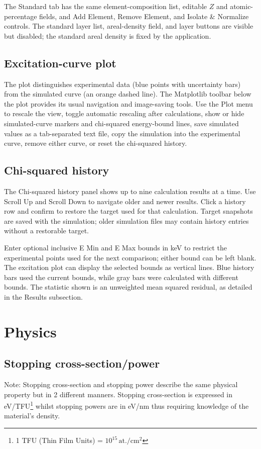 \documentclass[11pt,a4paper]{article}
\begin{document}
The Standard tab has the same element-composition list, editable $Z$ and atomic-percentage fields, and Add Element, Remove Element, and Isolate \& Normalize controls. The standard layer list, areal-density field, and layer buttons are visible but disabled; the standard areal density is fixed by the application.

\subsection{Excitation-curve plot}
The plot distinguishes experimental data (blue points with uncertainty bars) from the simulated curve (an orange dashed line). The Matplotlib toolbar below the plot provides its usual navigation and image-saving tools. Use the Plot menu to rescale the view, toggle automatic rescaling after calculations, show or hide simulated-curve markers and chi-squared energy-bound lines, save simulated values as a tab-separated text file, copy the simulation into the experimental curve, remove either curve, or reset the chi-squared history.

\subsection{Chi-squared history}
The Chi-squared history panel shows up to nine calculation results at a time. Use Scroll Up and Scroll Down to navigate older and newer results. Click a history row and confirm to restore the target used for that calculation. Target snapshots are saved with the simulation; older simulation files may contain history entries without a restorable target.

Enter optional inclusive E Min and E Max bounds in keV to restrict the experimental points used for the next comparison; either bound can be left blank. The excitation plot can display the selected bounds as vertical lines. Blue history bars used the current bounds, while gray bars were calculated with different bounds. The statistic shown is an unweighted mean squared residual, as detailed in the Results subsection.

\section{Physics}
\subsection{Stopping cross-section/power}
\label{sec:stopping}
Note: Stopping cross-section and stopping power describe the same physical property but in 2 different manners. Stopping cross-section is expressed in eV/TFU\footnote{1 TFU (Thin Film Units) = $10^{15}\, \text{at.}/\text{cm}^2$ } whilst stopping powers are in eV/nm thus requiring knowledge of the material's density.
\end{document}
